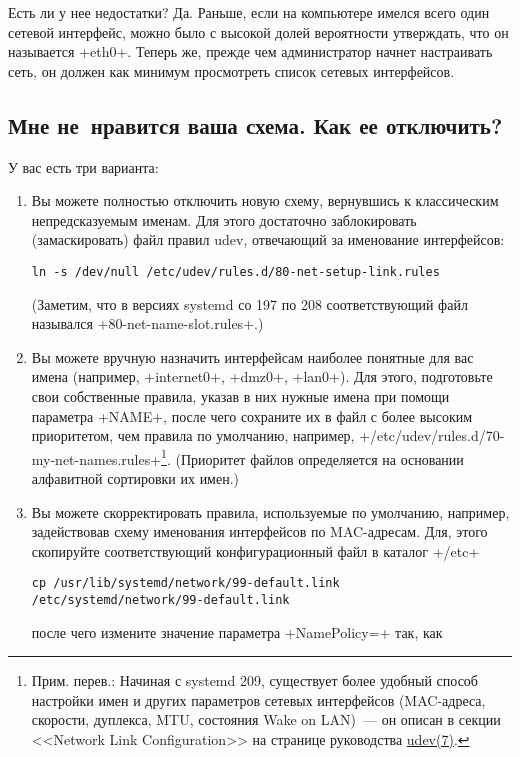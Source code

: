 \documentclass[10pt,oneside,a4paper]{article}
\begin{document}
Есть ли у нее недостатки? Да. Раньше, если на компьютере имелся всего один
сетевой интерфейс, можно было с высокой долей вероятности утверждать, что он
называется +eth0+. Теперь же, прежде чем администратор начнет настраивать сеть,
он должен как минимум просмотреть список сетевых интерфейсов.

\subsection{Мне не~нравится ваша схема. Как ее отключить?}

У вас есть три варианта:
\begin{enumerate}
	\item Вы можете полностью отключить новую схему, вернувшись к
		классическим непредсказуемым именам. Для этого достаточно
		заблокировать (замаскировать) файл правил udev, отвечающий за
		именование интерфейсов:
\begin{Verbatim}
ln -s /dev/null /etc/udev/rules.d/80-net-setup-link.rules
\end{Verbatim}
		(Заметим, что в версиях systemd со 197 по 208 соответствующий
		файл назывался +80-net-name-slot.rules+.)
	\item Вы можете вручную назначить интерфейсам наиболее понятные для вас
		имена (например, +internet0+, +dmz0+, +lan0+). Для этого,
		подготовьте свои собственные правила, указав в них нужные имена
		при помощи параметра +NAME+, после чего сохраните их в файл с
		более высоким приоритетом, чем правила по умолчанию, например,
		+/etc/udev/rules.d/70-my-net-names.rules+\footnote{Прим. перев.:
		Начиная с systemd 209, существует более удобный способ настройки
		имен и других параметров сетевых интерфейсов (MAC-адреса,
		скорости, дуплекса, MTU, состояния Wake on LAN)~--- он описан в
		секции <<Network Link Configuration>> на странице руководства
		\href{http://www.freedesktop.org/software/systemd/man/udev.html#Network%20Link%20Configuration}{udev(7)}.}.
		(Приоритет файлов определяется на основании алфавитной
		сортировки их имен.)
	\item Вы можете скорректировать правила, используемые по умолчанию,
		например, задействовав схему именования интерфейсов по
		MAC-адресам. Для, этого скопируйте соответствующий
		конфигурационный файл в каталог +/etc+
\begin{Verbatim}
cp /usr/lib/systemd/network/99-default.link /etc/systemd/network/99-default.link
\end{Verbatim}
		после чего измените значение параметра +NamePolicy=+ так, как

\end{enumerate}
\end{document}
